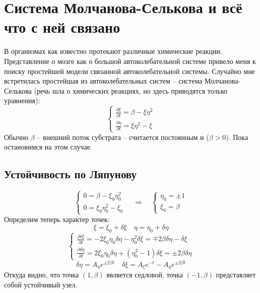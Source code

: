 \section{Система Молчанова-Селькова и всё что с ней связано}

В организмах как известно протекают различные химические реакции. Представление о мозге как о большой автоколебательной системе привело меня к поиску простейшей модели связанной автоколебательной системы. Случайно мне встретилась простейшая из автоколебательных систем -- система Молчанова-Селькова (речь шла о химических реакциях, но здесь приводятся только уравнения):
\[
	\begin{cases}
	\frac{\partial \xi}{\partial t} = \beta - \xi \eta^2 \\
	\frac{\partial \eta}{\partial t} = \xi \eta^2 - \xi
	\end{cases}
\]
Обычно $\beta$ -- внешний поток субстрата -- считается постоянным и ($\beta > 0$). Пока остановимся на этом случае.

\subsection{Устойчивость по Ляпунову}

\[
	\begin{cases}
	0 = \beta - \xi_0 \eta_0^2 \\
	0 = \xi_0 \eta_0^2 - \xi_0
	\end{cases}
	\quad 
	\Rightarrow
	\quad
	\begin{cases}
	\eta_0 = \pm 1 \\
	\xi_0 = \beta
	\end{cases}
\]
Определим теперь характер точек:
\[
	\xi = \xi_0 + \delta \xi \quad \eta = \eta_0 + \delta \eta
\]
\[
	\begin{cases}
	\frac{\partial \delta\xi}{\partial t} = - 2 \xi_0 \eta_0 \delta \eta - \eta_0^2 \delta \xi = \mp 2 \beta \delta \eta - \delta \xi\\
	\frac{\partial \delta\eta}{\partial t} = 2 \xi_0 \eta_0 \delta \eta + (\eta_0^2 - 1) \delta \xi = \pm 2 \beta \delta \eta
	\end{cases}
\]
\[
	\delta \eta = A_\eta e^{\pm 2 \beta t} \quad \delta \xi = A_\xi e^{-t} - A_\eta e^{\pm 2 \beta t}
\]
Откуда видно, что точка $(1, \beta)$ является седловой, точка $(-1, \beta)$ представляет собой устойчивый узел.